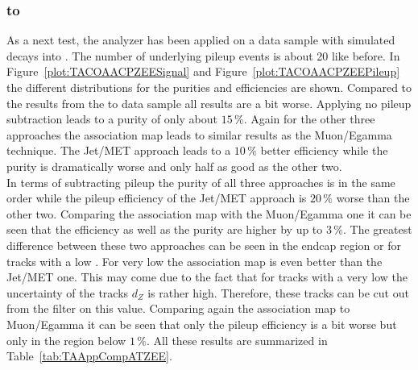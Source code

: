 

\subsubsection{\Zz to \EE \label{sec:TASEFRDACPZEE}}
As a next test, the analyzer has been applied on a data sample with simulated \Zz decays into \EE. The number of underlying pileup events is about 20 like before. In Figure~\ref{plot:TACOAACPZEESignal} and Figure~\ref{plot:TACOAACPZEEPileup} the different distributions for the purities and efficiencies are shown. Compared to the results from the \Zz to \MM data sample all results are a bit worse. Applying no pileup subtraction leads to a purity of only about $15\,\%$. Again for the other three approaches the association map leads to similar results as the Muon/Egamma technique. The Jet/MET approach leads to a $10\,\%$ better efficiency while the purity is dramatically worse and only half as good as the other two. \\
In terms of subtracting pileup the purity of all three approaches is in the same order while the pileup efficiency of the Jet/MET approach is $20\,\%$ worse than the other two. Comparing the association map with the Muon/Egamma one it can be seen that the efficiency as well as the purity are higher by up to $3\,\%$. The greatest difference between these two approaches can be seen in the endcap region or for tracks with a low \pt. For very low \pt the association map is even better than the Jet/MET one. This may come due to the fact that for tracks with a very low \pt the uncertainty of the tracks $d_{Z}$ is rather high. Therefore, these tracks can be cut out from the filter on this value. Comparing again the association map to Muon/Egamma it can be seen that only the pileup efficiency is a bit worse but only in the region below $1\,\%$. All these results are summarized in Table~\ref{tab:TAAppCompATZEE}.

